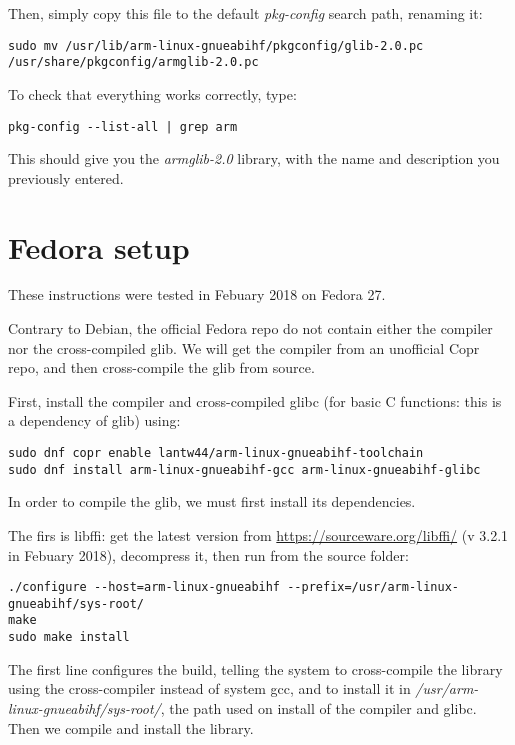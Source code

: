 \documentclass[a4paper,11pt]{article}
\begin{document}
Then, simply copy this file to the default \emph{pkg-config} search path, renaming it:

\begin{lstlisting}[]
sudo mv /usr/lib/arm-linux-gnueabihf/pkgconfig/glib-2.0.pc /usr/share/pkgconfig/armglib-2.0.pc
\end{lstlisting}

To check that everything works correctly, type:

\begin{lstlisting}[]
pkg-config --list-all | grep arm
\end{lstlisting}

This should give you the \emph{armglib-2.0} library, with the name and description you previously entered.

\section{Fedora setup}

These instructions were tested in Febuary 2018 on Fedora 27.

Contrary to Debian, the official Fedora repo do not contain either the compiler nor the cross-compiled glib. We will get the compiler from an unofficial Copr repo, and then cross-compile the glib from source.

First, install the compiler and cross-compiled glibc (for basic C functions: this is a dependency of glib) using:

\begin{lstlisting}
sudo dnf copr enable lantw44/arm-linux-gnueabihf-toolchain
sudo dnf install arm-linux-gnueabihf-gcc arm-linux-gnueabihf-glibc
\end{lstlisting}

In order to compile the glib, we must first install its dependencies.

The firs is libffi: get the latest version from  \href{https://sourceware.org/libffi/}{https://sourceware.org/libffi/} (v 3.2.1 in Febuary 2018), decompress it, then run from the source folder:

\begin{lstlisting}[]
./configure --host=arm-linux-gnueabihf --prefix=/usr/arm-linux-gnueabihf/sys-root/
make
sudo make install
\end{lstlisting}

The first line configures the build, telling the system to cross-compile the library using the cross-compiler instead of system gcc, and to install it in \emph{/usr/arm-linux-gnueabihf/sys-root/}, the path used on install of the compiler and glibc. Then we compile and install the library.
\end{document}
